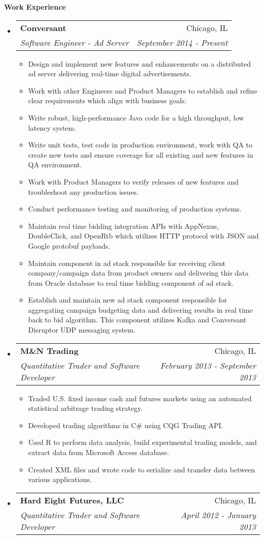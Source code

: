 \documentclass[letterpaper,10pt]{article}
\makeatletter
\newcommand{\resitem}[1]{\item #1 \vspace{-2pt}}
\newcommand{\resheading}[1]{{\large \colorbox{mygrey}{\begin{minipage}{\textwidth}{\textbf{#1 \vphantom{p\^{E}}}}\end{minipage}}}}
\newcommand{\ressubheading}[4]{
\begin{tabular*}{7.0in}{l@{\extracolsep{\fill}}r}
		\textbf{#1} & #2 \\
		\textit{#3} & \textit{#4} \\
\end{tabular*}\vspace{-6pt}}
\makeatother
\begin{document}
\resheading{Work Experience}
\begin{itemize}
\item
	\ressubheading{Conversant}{Chicago, IL}{Software Engineer - Ad Server}{September 2014 - Present}
	\begin{itemize}
		\resitem{Design and implement new features and enhancements on a distributed ad server delivering real-time digital advertisements.}
		\resitem{Work with other Engineers and Product Managers to establish and refine clear requirements which align with business goals.}
		\resitem{Write robust, high-performance Java code for a high throughput, low latency system.}
		\resitem{Write unit tests, test code in production environment, work with QA to create new tests and ensure coverage for all existing and new features in QA environment.}
		\resitem{Work with Product Managers to verify releases of new features and troubleshoot any production issues.}
		\resitem{Conduct performance testing and monitoring of production systems.}
		\resitem{Maintain real time bidding integration APIs with AppNexus, DoubleClick, and OpenRtb which utilizes HTTP protocol with JSON and Google protobuf payloads.}
		\resitem{Maintain component in ad stack responsible for receiving client company/campaign data from product owners and delivering this data from Oracle database to real time bidding component of ad stack.}
		\resitem{Establish and maintain new ad stack component responsible for aggregating campaign budgeting data and delivering results in real time back to bid algorithm.  This component utilizes Kafka and Conversant Disruptor UDP messaging system. }
	\end{itemize}
\item
	\ressubheading{M\&N Trading}{Chicago, IL}{Quantitative Trader and Software Developer}{February 2013 - September 2013}
	\begin{itemize}
		\resitem{Traded U.S. fixed income cash and futures markets using an automated statistical arbitrage 
   trading strategy.}
		\resitem{Developed trading algorithms in C\# using CQG Trading API.}
		\resitem{Used R to perform data analysis, build experimental trading models, and extract data from 
   Microsoft Access database.}
		\resitem{Created XML files and wrote code to serialize and transfer data between various applications. }
	\end{itemize}
\item
	\ressubheading{Hard Eight Futures, LLC}{Chicago, IL}{Quantitative Trader and Software Developer}{April 2012 - January 2013}
	\begin{itemize}

\end{itemize}
\end{itemize}
\end{document}
